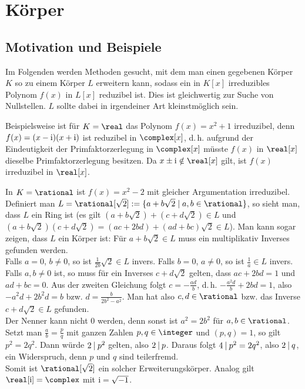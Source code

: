 \chapter{%
    Körper%
}

\section{%
    Motivation und Beispiele%
}

\begin{Bem}
    Im Folgenden werden Methoden gesucht, mit dem man einen gegebenen
    Körper $K$ so zu einem Körper $L$ erweitern kann,
    sodass ein in $K[x]$ irreduzibles Polynom $f(x)$ in $L[x]$ reduzibel ist.
    Dies ist gleichwertig zur Suche von Nullstellen.
    $L$ sollte dabei in irgendeiner Art kleinstmöglich sein.
\end{Bem}

\begin{Bsp}
    Beispielsweise ist für $K = \real$ das Polynom $f(x) = x^2 + 1$
    irreduzibel, denn\\
    $f(x) = (x - \text{i})(x + \text{i})$ ist reduzibel in $\complex[x]$,
    d.\,h. aufgrund der Eindeutigkeit der Primfaktorzerlegung in $\complex[x]$
    müsste $f(x)$ in $\real[x]$ dieselbe Primfaktorzerlegung besitzen.
    Da $x \pm \i \notin \real[x]$ gilt, ist $f(x)$ irreduzibel in $\real[x]$.
\end{Bsp}

\begin{Bsp}
    In $K = \rational$ ist $f(x) = x^2 - 2$ mit gleicher Argumentation
    irreduzibel.
    Definiert man $L = \rational[\sqrt{2}] :=
    \{a + b\sqrt{2} \;|\; a, b \in \rational\}$, so sieht man, dass $L$
    ein Ring ist
    (es gilt $(a + b\sqrt{2}) + (c + d\sqrt{2}) \in L$ und
    $(a + b\sqrt{2})(c + d\sqrt{2}) = (ac + 2bd) + (ad + bc)\sqrt{2} \in L$).
    Man kann sogar zeigen, dass $L$ ein Körper ist:
    Für $a + b\sqrt{2} \in L$ muss ein multiplikativ
    Inverses gefunden werden.\\
    Falls $a = 0$, $b \not= 0$, so ist $\frac{1}{2b} \sqrt{2} \in L$ invers.
    Falls $b = 0$, $a \not= 0$, so ist $\frac{1}{a} \in L$ invers.\\
    Falls $a, b \not= 0$ ist, so muss für ein Inverses $c + d\sqrt{2}$ gelten,
    dass $ac + 2bd = 1$ und $ad + bc = 0$.
    Aus der zweiten Gleichung folgt $c = -\frac{ad}{b}$, d.\,h.
    $-\frac{a^2 d}{b} + 2bd = 1$, also
    $-a^2 d + 2b^2 d = b$ bzw.
    $d = \frac{b}{2b^2 - a^2}$.
    Man hat also $c, d \in \rational$ bzw. das Inverse $c + d\sqrt{2} \in L$
    gefunden.\\
    Der Nenner kann nicht $0$ werden, denn sonst ist
    $a^2 = 2b^2$ für $a, b \in \rational$.
    Setzt man $\frac{a}{b} = \frac{p}{q}$ mit ganzen Zahlen $p, q \in \integer$
    und $(p, q) = 1$, so gilt $p^2 = 2q^2$.
    Dann würde $2 \mathbin{|} p^2$ gelten, also $2 \mathbin{|} p$.
    Daraus folgt $4 \mathbin{|} p^2 = 2q^2$, also $2 \mathbin{|} q$,
    ein Widerspruch, denn $p$ und $q$ sind teilerfremd.\\
    Somit ist $\rational[\sqrt{2}]$ ein solcher Erweiterungskörper.
    Analog gilt $\real[\i] = \complex$ mit $\text{i} = \sqrt{-1}$.
\end{Bsp}

